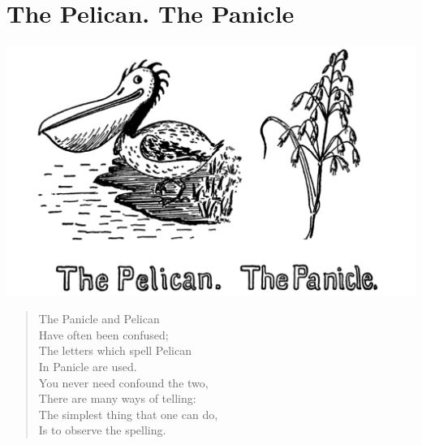 \documentclass[letterpaper, 10pt, openany]{memoir}
\begin{document}
\chapter{The Pelican. The Panicle}
\includegraphics[width=1\textwidth]{f-p07.png}
\vspace{\onelineskip}
\begin{verse}\huge
The Panicle and Pelican\\
Have often been confused;\\
The letters which spell Pelican\\
In Panicle are used.\\
You never need confound the two,\\
There are many ways of telling:\\
The simplest thing that one can do,\\
Is to observe the spelling.\\
\end{verse}
\vspace{\onelineskip}
\end{document}
